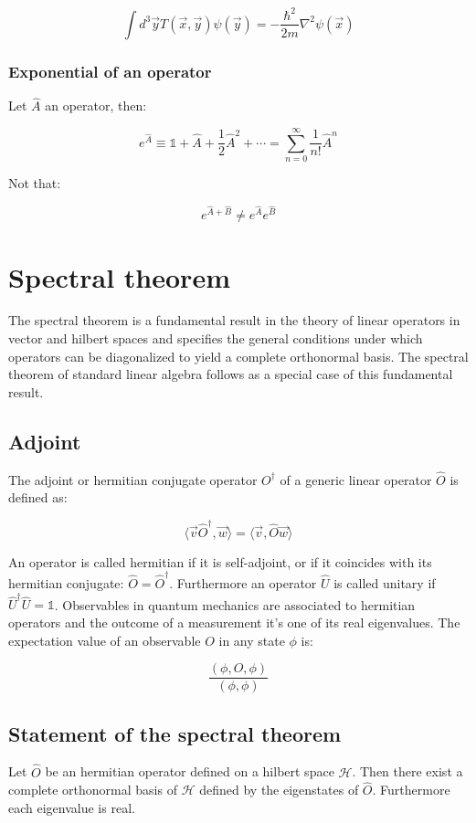 		$$\int d^3\vec{y}T(\vec{x}, \vec{y})\psi(\vec{y}) = -\frac{\hbar^2}{2m}\nabla^2\psi(\vec{x})$$

		\subsubsection{Exponential of an operator}
		Let $\hat{A}$ an operator, then:

		$$e^{\hat{A}} \equiv\mathbb{1} + \hat{A} + \frac{1}{2}\hat{A}^2+\cdots = \sum\limits_{n=0}^\infty\frac{1}{n!}\hat{A}^n$$

		Not that:

		$$e^{\hat{A} + \hat{B}} \neq e^{\hat{A}}e^{\hat{B}}$$

\section{Spectral theorem}
The spectral theorem is a fundamental result in the theory of linear operators in vector and hilbert spaces and specifies the general conditions under which operators can be diagonalized to yield a complete orthonormal basis.
The spectral theorem of standard linear algebra follows as a special case of this fundamental result.

	\subsection{Adjoint}
	The adjoint or hermitian conjugate operator $O^\dagger$ of a generic linear operator $\hat{O}$ is defined as:

	$$\langle \vec{v}\hat{O}^\dagger, \vec{w}\rangle = \langle\vec{v}, \hat{O}\vec{w}\rangle$$

	An operator is called hermitian if it is self-adjoint, or if it coincides with its hermitian conjugate: $\hat{O} = \hat{O}^\dagger$.
	Furthermore an operator $\hat{U}$ is called unitary if $\hat{U}^\dagger\hat{U} = \mathbb{1}$.
	Observables in quantum mechanics are associated to hermitian operators and the outcome of a measurement it's one of its real eigenvalues.
	The expectation value of an observable $O$ in any state $\phi$ is:

	$$\frac{(\phi,O,\phi)}{(\phi,\phi)}$$

	\subsection{Statement of the spectral theorem}
	Let $\hat{O}$ be an hermitian operator defined on a hilbert space $\mathcal{H}$.
	Then there exist a complete orthonormal basis of $\mathcal{H}$ defined by the eigenstates of $\hat{O}$.
	Furthermore each eigenvalue is real.

